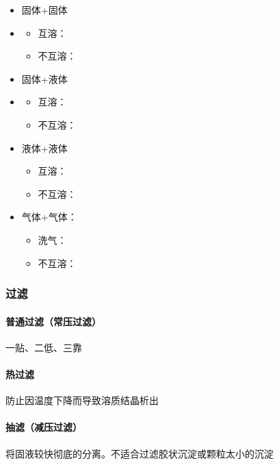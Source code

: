 \documentclass[10pt]{article}
\begin{document}
	\begin{itemize}
		\item 固体+固体
		\item \begin{itemize}
			\item 互溶：
			\item 不互溶：
		\end{itemize}
		\item 固体+液体
		\item \begin{itemize}
			\item 互溶：
			\item 不互溶：
		\end{itemize}
		\item 液体+液体
		\begin{itemize}
			\item 互溶：
			\item 不互溶：
		\end{itemize}
		\item 气体+气体：
		\begin{itemize}
			\item 洗气：
			\item 不互溶：
		\end{itemize}
	\end{itemize}
	
	\subsubsection{过滤}
	
	\paragraph{普通过滤（常压过滤）}
	
	一贴、二低、三靠
	
	\paragraph{热过滤}
	
	防止因温度下降而导致溶质结晶析出
	
	\paragraph{抽滤（减压过滤）}
	
	将固液较快彻底的分离。不适合过滤胶状沉淀或颗粒太小的沉淀
	
	\subsubsection{}
	
\end{document}

